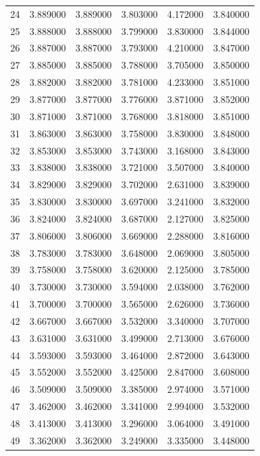 \begin{tabular}{lrrrrr}
24 & 3.889000 & 3.889000 & 3.803000 & 4.172000 & 3.840000 \\
25 & 3.888000 & 3.888000 & 3.799000 & 3.830000 & 3.844000 \\
26 & 3.887000 & 3.887000 & 3.793000 & 4.210000 & 3.847000 \\
27 & 3.885000 & 3.885000 & 3.788000 & 3.705000 & 3.850000 \\
28 & 3.882000 & 3.882000 & 3.781000 & 4.233000 & 3.851000 \\
29 & 3.877000 & 3.877000 & 3.776000 & 3.871000 & 3.852000 \\
30 & 3.871000 & 3.871000 & 3.768000 & 3.818000 & 3.851000 \\
31 & 3.863000 & 3.863000 & 3.758000 & 3.830000 & 3.848000 \\
32 & 3.853000 & 3.853000 & 3.743000 & 3.168000 & 3.843000 \\
33 & 3.838000 & 3.838000 & 3.721000 & 3.507000 & 3.840000 \\
34 & 3.829000 & 3.829000 & 3.702000 & 2.631000 & 3.839000 \\
35 & 3.830000 & 3.830000 & 3.697000 & 3.241000 & 3.832000 \\
36 & 3.824000 & 3.824000 & 3.687000 & 2.127000 & 3.825000 \\
37 & 3.806000 & 3.806000 & 3.669000 & 2.288000 & 3.816000 \\
38 & 3.783000 & 3.783000 & 3.648000 & 2.069000 & 3.805000 \\
39 & 3.758000 & 3.758000 & 3.620000 & 2.125000 & 3.785000 \\
40 & 3.730000 & 3.730000 & 3.594000 & 2.038000 & 3.762000 \\
41 & 3.700000 & 3.700000 & 3.565000 & 2.626000 & 3.736000 \\
42 & 3.667000 & 3.667000 & 3.532000 & 3.340000 & 3.707000 \\
43 & 3.631000 & 3.631000 & 3.499000 & 2.713000 & 3.676000 \\
44 & 3.593000 & 3.593000 & 3.464000 & 2.872000 & 3.643000 \\
45 & 3.552000 & 3.552000 & 3.425000 & 2.847000 & 3.608000 \\
46 & 3.509000 & 3.509000 & 3.385000 & 2.974000 & 3.571000 \\
47 & 3.462000 & 3.462000 & 3.341000 & 2.994000 & 3.532000 \\
48 & 3.413000 & 3.413000 & 3.296000 & 3.064000 & 3.491000 \\
49 & 3.362000 & 3.362000 & 3.249000 & 3.335000 & 3.448000 \\

\end{tabular}
